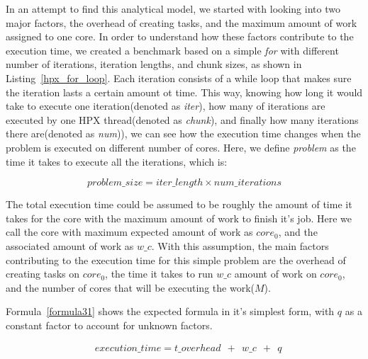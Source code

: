 In an attempt to find this analytical model, we started with looking into two major factors, the overhead of creating tasks, and the maximum amount of work assigned to one core. 
In order to understand how these factors contribute to the execution time, we created a benchmark based on a simple \textit{for} with different number of iterations, iteration lengths, and chunk sizes, as shown in Listing~\ref{hpx_for_loop}. 
Each iteration consists of a while loop that makes sure the iteration lasts a certain amount ot time. This way, knowing how long it would take to execute one iteration(denoted as \textit{iter}), how many of iterations are executed by one HPX thread(denoted as \textit{chunk}), and finally how many iterations there are(denoted as \textit{num})), we can see how the execution time changes when the problem is executed on different number of cores. Here, we define \textit{problem} as the time it takes to execute all the iterations, which is:

\begin{equation}\label{problem_size}
problem\_size = iter\_length\times{num\_iterations}
\end{equation}

The total execution time could be assumed to be roughly the amount of time it takes for the core with the maximum amount of work to finish it's job. Here we call the core with maximum expected amount of work as $core_0$, and the associated amount of work as $w\_c$. 
With this assumption, the main factors contributing to the execution time for this simple problem are the overhead of creating tasks on $core_0$, the time it takes to run $w\_c$ amount of work on $core_0$, and the number of cores that will be executing the work($M$). 


Formula~\ref{formula31} shows the expected formula in it's simplest form, with $q$ as a constant factor to account for unknown factors.  

\begin{equation}\label{formula31}
\begin{aligned}
&execution\_time = 
t\_{overhead}\:\:+\:\:w\_c\:\:+\:\:q
\end{aligned}
\end{equation}

